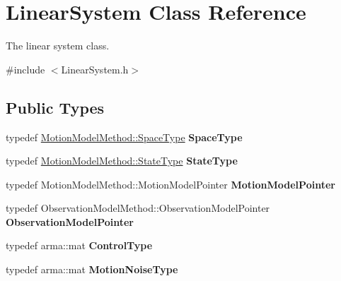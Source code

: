 \hypertarget{class_linear_system}{\section{\-Linear\-System \-Class \-Reference}
\label{class_linear_system}
}


\-The linear system class.  




{\ttfamily \#include $<$\-Linear\-System.\-h$>$}

\subsection*{\-Public \-Types}
\begin{DoxyCompactItemize}
\item 
\hypertarget{class_linear_system_a6e2a2cea01eb7d624ebddbd35da87391}{typedef \*
\hyperlink{class_s_e2_belief_space}{\-Motion\-Model\-Method\-::\-Space\-Type} {\bfseries \-Space\-Type}}\label{class_linear_system_a6e2a2cea01eb7d624ebddbd35da87391}

\item 
\hypertarget{class_linear_system_a18a7ea2657a1fbca633a2dfb92fbdfcc}{typedef \*
\hyperlink{class_s_e2_belief_space_1_1_state_type}{\-Motion\-Model\-Method\-::\-State\-Type} {\bfseries \-State\-Type}}\label{class_linear_system_a18a7ea2657a1fbca633a2dfb92fbdfcc}

\item 
\hypertarget{class_linear_system_a45a2dc5d393c50bc2d475cd9f4ff1db0}{typedef \*
\-Motion\-Model\-Method\-::\-Motion\-Model\-Pointer {\bfseries \-Motion\-Model\-Pointer}}\label{class_linear_system_a45a2dc5d393c50bc2d475cd9f4ff1db0}

\item 
\hypertarget{class_linear_system_a239819b1a3b5554c9b1ffbe669492b6e}{typedef \*
\-Observation\-Model\-Method\-::\-Observation\-Model\-Pointer {\bfseries \-Observation\-Model\-Pointer}}\label{class_linear_system_a239819b1a3b5554c9b1ffbe669492b6e}

\item 
\hypertarget{class_linear_system_ac89acd811aeb518081df96fb3904b176}{typedef arma\-::mat {\bfseries \-Control\-Type}}\label{class_linear_system_ac89acd811aeb518081df96fb3904b176}

\item 
\hypertarget{class_linear_system_abdf29233ee72fe498a01fe4bae172efd}{typedef arma\-::mat {\bfseries \-Motion\-Noise\-Type}}\label{class_linear_system_abdf29233ee72fe498a01fe4bae172efd}


\end{DoxyCompactItemize}
